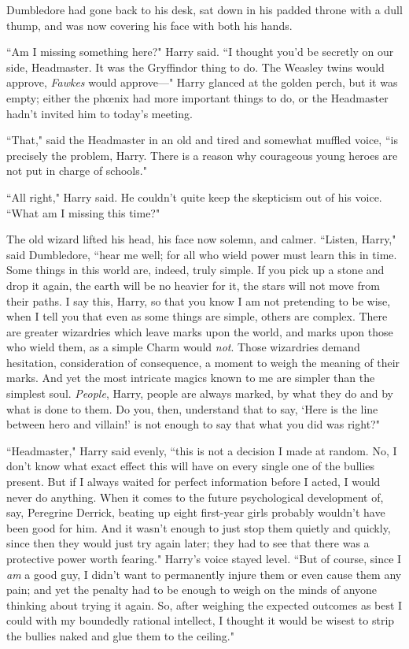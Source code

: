 Dumbledore had gone back to his desk, sat down in his padded throne with a dull thump, and was now covering his face with both his hands.

``Am I missing something here?" Harry said. ``I thought you'd be secretly on our side, Headmaster. It was the Gryffindor thing to do. The Weasley twins would approve, \emph{Fawkes} would approve—" Harry glanced at the golden perch, but it was empty; either the phœnix had more important things to do, or the Headmaster hadn't invited him to today's meeting.

``That," said the Headmaster in an old and tired and somewhat muffled voice, ``is precisely the problem, Harry. There is a reason why courageous young heroes are not put in charge of schools."

``All right," Harry said. He couldn't quite keep the skepticism out of his voice. ``What am I missing this time?"

The old wizard lifted his head, his face now solemn, and calmer. ``Listen, Harry," said Dumbledore, ``hear me well; for all who wield power must learn this in time. Some things in this world are, indeed, truly simple. If you pick up a stone and drop it again, the earth will be no heavier for it, the stars will not move from their paths. I say this, Harry, so that you know I am not pretending to be wise, when I tell you that even as some things are simple, others are complex. There are greater wizardries which leave marks upon the world, and marks upon those who wield them, as a simple Charm would \emph{not}. Those wizardries demand hesitation, consideration of consequence, a moment to weigh the meaning of their marks. And yet the most intricate magics known to me are simpler than the simplest soul. \emph{People}, Harry, people are always marked, by what they do and by what is done to them. Do you, then, understand that to say, `Here is the line between hero and villain!' is not enough to say that what you did was right?"

``Headmaster," Harry said evenly, ``this is not a decision I made at random. No, I don't know what exact effect this will have on every single one of the bullies present. But if I always waited for perfect information before I acted, I would never do anything. When it comes to the future psychological development of, say, Peregrine Derrick, beating up eight first-year girls probably wouldn't have been good for him. And it wasn't enough to just stop them quietly and quickly, since then they would just try again later; they had to see that there was a protective power worth fearing." Harry's voice stayed level. ``But of course, since I \emph{am} a good guy, I didn't want to permanently injure them or even cause them any pain; and yet the penalty had to be enough to weigh on the minds of anyone thinking about trying it again. So, after weighing the expected outcomes as best I could with my boundedly rational intellect, I thought it would be wisest to strip the bullies naked and glue them to the ceiling."

